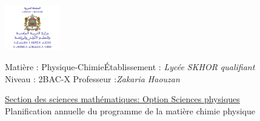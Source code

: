 \documentclass[12pt]{article}
\newcommand\headerMe[2]{\noindent{}#1\hfill#2}
\begin{document}
\begin{center}
\includegraphics[width = 0.18\textwidth]{./img/logoMin.png}
\vspace{-3cm}
\end{center}
\headerMe{Matière : Physique-Chimie}{Établissement : \emph{Lycée SKHOR qualifiant}}\\
\headerMe{ Niveau : 2BAC-X }{  Professeur :\emph{Zakaria Haouzan}}\\

\begin{center}
	\vspace{0.5cm}
\underline{Section des sciences mathématiques: Option Sciences physiques
}
\\
\hrulefill
\Large{Planification annuelle
du programme de la matière chimie physique}
\hrulefill\\
\end{center}
\end{document}
